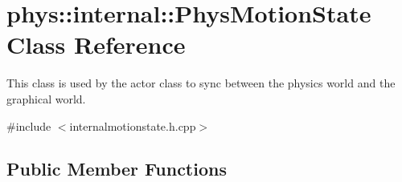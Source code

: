 \hypertarget{classphys_1_1internal_1_1PhysMotionState}{
\section{phys::internal::PhysMotionState Class Reference}
\label{dc/df8/classphys_1_1internal_1_1PhysMotionState}
}


This class is used by the actor class to sync between the physics world and the graphical world.  




{\ttfamily \#include $<$internalmotionstate.h.cpp$>$}

\subsection*{Public Member Functions}
